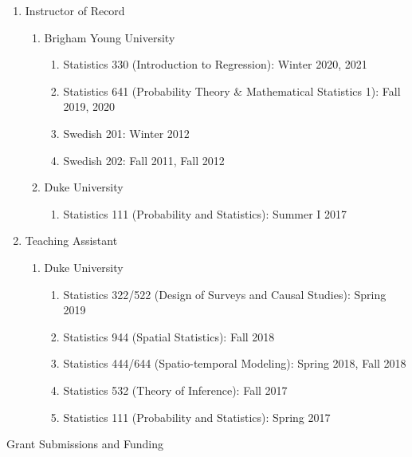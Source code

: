 \documentclass[11pt]{article}
\newcommand{\head}[1]{ %
    \bigskip %
    \begin{large}\begin{bf}{#1}\end{bf}\end{large} %

    \ \\ [-1.3cm] %

    \hrulefill}
\begin{document}
\begin{enumerate}[label=$\bullet$]
\item Instructor of Record
\begin{enumerate}[label=$\cdot$]
\item Brigham Young University
\begin{enumerate}[label=$\cdot$]
\item Statistics 330 (Introduction to Regression): Winter 2020, 2021
\item Statistics 641 (Probability Theory \& Mathematical Statistics 1): Fall 2019, 2020
\item Swedish 201: Winter 2012 
\item Swedish 202: Fall 2011, Fall 2012
\end{enumerate}
\item Duke University
\begin{enumerate}[label=$\cdot$]
\item Statistics 111 (Probability and Statistics): Summer I 2017
\end{enumerate}
\end{enumerate}
\item Teaching Assistant
\begin{enumerate}[label=$\cdot$]
\item Duke University
\begin{enumerate}[label=$\cdot$]
\item Statistics 322/522 (Design of Surveys and Causal Studies): Spring 2019
\item Statistics 944 (Spatial Statistics): Fall 2018
\item Statistics 444/644 (Spatio-temporal Modeling): Spring 2018, Fall 2018
\item Statistics 532 (Theory of Inference): Fall 2017
\item Statistics 111 (Probability and Statistics): Spring 2017 
\end{enumerate}
\end{enumerate}
\end{enumerate}

\head{Grant Submissions and Funding}
\end{document}
